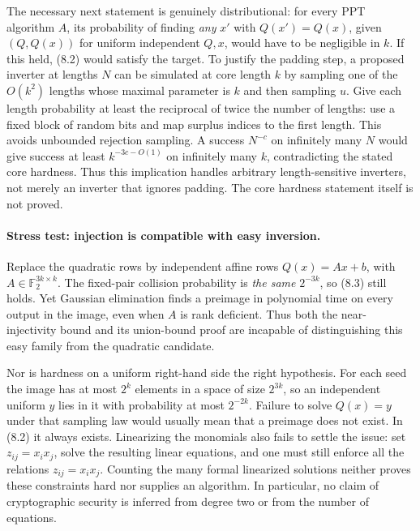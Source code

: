\documentclass[11pt,a4paper]{article}
\newcommand{\F}{\mathbb{F}}
\begin{document}
The necessary next statement is genuinely distributional: for every PPT
algorithm $A$, its probability of finding \emph{any} $x'$ with
$Q(x')=Q(x)$, given $(Q,Q(x))$ for uniform independent $Q,x$, would have
to be negligible in $k$. If this held, (8.2) would satisfy the target.
To justify the padding step, a proposed inverter at lengths $N$ can be
simulated at core length $k$ by sampling one of the
$O(k^2)$ lengths whose maximal parameter is $k$ and then sampling $u$.
Give each length probability at least the reciprocal of twice the
number of lengths: use a fixed block of random bits and map surplus
indices to the first length. This avoids unbounded rejection sampling.
A success $N^{-c}$ on infinitely many $N$ would give success at least
$k^{-3c-O(1)}$ on infinitely many $k$, contradicting the stated core
hardness. Thus this implication handles arbitrary length-sensitive
inverters, not merely an inverter that ignores padding. The core
hardness statement itself is not proved.

\paragraph{Stress test: injection is compatible with easy inversion.}
Replace the quadratic rows by independent affine rows $Q(x)=Ax+b$, with
$A\in\F_2^{3k\times k}$. The fixed-pair collision probability is
\emph{the same} $2^{-3k}$, so (8.3) still holds. Yet Gaussian elimination
finds a preimage in polynomial time on every output in the image, even
when $A$ is rank deficient. Thus both the near-injectivity bound and
its union-bound proof are incapable of distinguishing this easy family
from the quadratic candidate.

Nor is hardness on a uniform right-hand side the right hypothesis.
For each seed the image has at most $2^k$ elements in a space of size
$2^{3k}$, so an independent uniform $y$ lies in it with probability at
most $2^{-2k}$. Failure to solve $Q(x)=y$ under that sampling law would
usually mean that a preimage does not exist. In (8.2) it always exists.
Linearizing the monomials also fails to settle the issue: set
$z_{ij}=x_ix_j$, solve the resulting linear equations, and one must still
enforce all the relations $z_{ij}=x_ix_j$. Counting the many formal
linearized solutions neither proves these constraints hard nor supplies
an algorithm. In particular, no claim of cryptographic security is
inferred from degree two or from the number of equations.
\end{document}
